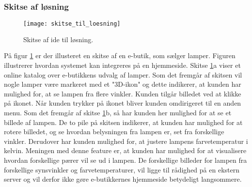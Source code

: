 \subsubsection{Skitse af løsning}

\label{sec:skitse_loesning}

\begin{figure}[H]
   \centering
   \texttt{[image: skitse\_til\_loesning]}
   \caption{Skitse af ide til løsning.}
   \label{fig:skitse_af_ide}
\end{figure}

På figur \ref{fig:skitse_af_ide} er der illusteret en skitse af en e-butik, som sælger lamper. Figuren illustrerer hvordan systemet kan integreres på en hjemmeside. Skitse \ref{fig:skitse_af_ide}a viser et online katalog over e-butikkens udvalg af lamper. Som det fremgår af skitsen vil nogle lamper være markeret med et "3D-ikon" og dette indikerer, at kunden har mulighed for, at se lampen fra flere vinkler. Kunden tilgår billedet ved at klikke på ikonet. Når kunden trykker på ikonet bliver kunden omdirigeret til en anden menu. Som det fremgår af skitse \ref{fig:skitse_af_ide}b, så har kunden her mulighed for at se et billede af lampen. De to pile på skitsen indikerer, at kunden har mulighed for at rotere billedet, og se hvordan belysningen fra lampen er, set fra forskellige vinkler.
Derudover har kunden mulighed for, at justere lampens farvetemperatur i kelvin. Meningen med denne feature er, at kunden har mulighed for at visualisere hvordan forskellige pærer vil se ud i lampen. De forskellige billeder for lampen fra forskellige synsvinkler og farvetemperaturer, vil ligge til rådighed på en ekstern server og vil derfor ikke gøre e-butikkernes hjemmeside betydeligt langsommere. 

